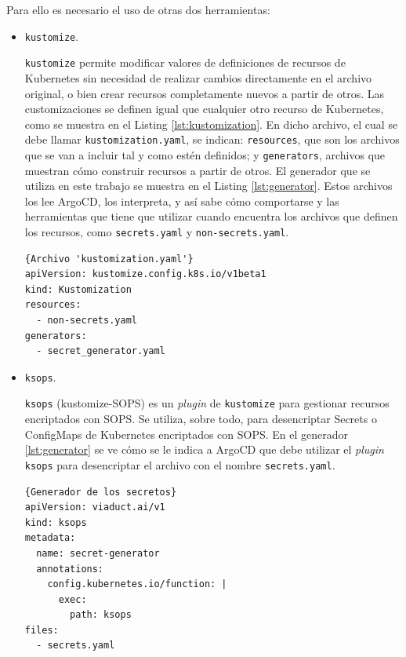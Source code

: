 Para ello es necesario el uso de otras dos herramientas:

\begin{itemize}
  \item \texttt{kustomize}\cite{kustomize}.

    \texttt{kustomize} permite modificar valores de definiciones de recursos de Kubernetes sin necesidad de realizar cambios directamente en el archivo original, o bien crear recursos completamente nuevos a partir de otros. Las customizaciones se definen igual que cualquier otro recurso de Kubernetes, como se muestra en el Listing \ref{lst:kustomization}. En dicho archivo, el cual se debe llamar \texttt{kustomization.yaml}, se indican: \texttt{resources}, que son los archivos que se van a incluir tal y como estén definidos; y \texttt{generators}, archivos que muestran cómo construir recursos a partir de otros. El generador que se utiliza en este trabajo se muestra en el Listing \ref{lst:generator}. Estos archivos los lee ArgoCD, los interpreta, y así sabe cómo comportarse y las herramientas que tiene que utilizar cuando encuentra los archivos que definen los recursos, como \texttt{secrets.yaml} y \texttt{non-secrets.yaml}.

\begin{lstlisting}[language=helm,label=lst:kustomization]{Archivo 'kustomization.yaml'}
apiVersion: kustomize.config.k8s.io/v1beta1
kind: Kustomization
resources:
  - non-secrets.yaml
generators:
  - secret_generator.yaml
\end{lstlisting}

  \item \texttt{ksops}\cite{ksops}.

    \texttt{ksops} (kustomize-SOPS) es un \textit{plugin} de \texttt{kustomize} para gestionar recursos encriptados con SOPS. Se utiliza, sobre todo, para desencriptar Secrets o ConfigMaps de Kubernetes encriptados con SOPS. En el generador \ref{lst:generator} se ve cómo se le indica a ArgoCD que debe utilizar el \textit{plugin}  \texttt{ksops} para desencriptar el archivo con el nombre \texttt{secrets.yaml}.

\begin{lstlisting}[language=helm,label=lst:generator]{Generador de los secretos}
apiVersion: viaduct.ai/v1
kind: ksops
metadata:
  name: secret-generator
  annotations:
    config.kubernetes.io/function: |
      exec:
        path: ksops
files:
  - secrets.yaml
\end{lstlisting}

\end{itemize}

